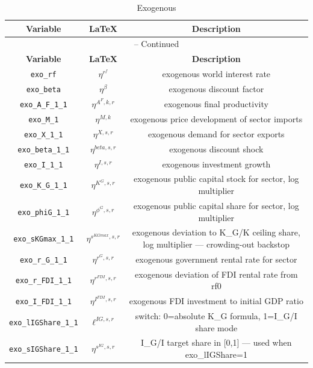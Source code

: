 \begin{center}
\begin{longtable}{ccc}
\caption{Exogenous}\\%
\hline%
\multicolumn{1}{c}{\textbf{Variable}} &
\multicolumn{1}{c}{\textbf{\LaTeX}} &
\multicolumn{1}{c}{\textbf{Description}}\\%
\hline\hline%
\endfirsthead
\multicolumn{3}{c}{{\tablename} \thetable{} -- Continued}\\%
\hline%
\multicolumn{1}{c}{\textbf{Variable}} &
\multicolumn{1}{c}{\textbf{\LaTeX}} &
\multicolumn{1}{c}{\textbf{Description}}\\%
\hline\hline%
\endhead
\texttt{exo\_rf} & ${\eta^{r^f}}$ & exogenous world interest rate\\
\texttt{exo\_beta} & ${\eta^{\beta}}$ & exogenous discount factor\\
\texttt{exo\_A\_F\_1\_1} & ${\eta^{A^F,k,r}}$ & exogenous final productivity\\
\texttt{exo\_M\_1} & ${\eta^{M,k}}$ & exogenous price development of sector imports\\
\texttt{exo\_X\_1\_1} & ${\eta^{X,s,r}}$ & exogenous demand for sector exports\\
\texttt{exo\_beta\_1\_1} & ${\eta^{beta,s,r}}$ & exogenous discount shock\\
\texttt{exo\_I\_1\_1} & ${\eta^{I,s,r}}$ & exogenous investment growth\\
\texttt{exo\_K\_G\_1\_1} & ${\eta^{K^G,s,r}}$ & exogenous public capital stock for sector, log multiplier\\
\texttt{exo\_phiG\_1\_1} & ${\eta^{\phi^{G},s,r}}$ & exogenous public capital share for sector, log multiplier\\
\texttt{exo\_sKGmax\_1\_1} & ${\eta^{s^{KGmax},s,r}}$ & exogenous deviation to K\_G/K ceiling share, log multiplier — crowding-out backstop\\
\texttt{exo\_r\_G\_1\_1} & ${\eta^{r^G,s,r}}$ & exogenous government rental rate for sector\\
\texttt{exo\_r\_FDI\_1\_1} & ${\eta^{r^{FDI},s,r}}$ & exogenous deviation of FDI rental rate from rf0\\
\texttt{exo\_I\_FDI\_1\_1} & ${\eta^{I^{FDI},s,r}}$ & exogenous FDI investment to initial GDP ratio\\
\texttt{exo\_lIGShare\_1\_1} & ${\ell^{IG,s,r}}$ & switch: 0=absolute K\_G formula, 1=I\_G/I share mode\\
\texttt{exo\_sIGShare\_1\_1} & ${\eta^{s^{IG},s,r}}$ & I\_G/I target share in [0,1] — used when exo\_lIGShare=1\\

\end{longtable}
\end{center}
